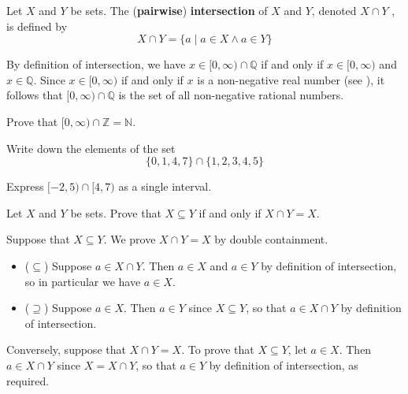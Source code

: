 \begin{definition}
Let $X$ and $Y$ be sets. The (\textbf{pairwise}) \textbf{intersection} of $X$ and $Y$, denoted $X \cap Y$ , is defined by
\[ X \cap Y = \{ a \mid a \in X \wedge a \in Y \} \]
\end{definition}

\begin{example}
By definition of intersection, we have $x \in [0,\infty) \cap \mathbb{Q}$ if and only if $x \in [0,\infty)$ and $x \in \mathbb{Q}$. Since $x \in [0,\infty)$ if and only if $x$ is a non-negative real number (see ), it follows that $[0,\infty) \cap \mathbb{Q}$ is the set of all non-negative rational numbers.
\end{example}

\begin{exercise}
Prove that $[0,\infty) \cap \mathbb{Z} = \mathbb{N}$.
\end{exercise}

\begin{exercise}
Write down the elements of the set
\[ \{ 0, 1, 4, 7 \} \cap \{ 1, 2, 3, 4, 5 \} \]
\end{exercise}

\begin{exercise}
Express $[-2,5) \cap [4,7)$ as a single interval.
\end{exercise}

\begin{proposition}
\label{propSubsetFromIntersection}
Let $X$ and $Y$ be sets. Prove that $X \subseteq Y$ if and only if $X \cap Y = X$.
\end{proposition}

\begin{cproof}
Suppose that $X \subseteq Y$. We prove $X \cap Y = X$ by double containment.
\begin{itemize}
\item ($\subseteq$) Suppose $a \in X \cap Y$. Then $a \in X$ and $a \in Y$ by definition of intersection, so in particular we have $a \in X$.
\item ($\supseteq$) Suppose $a \in X$. Then $a \in Y$ since $X \subseteq Y$, so that $a \in X \cap Y$ by definition of intersection.
\end{itemize}

Conversely, suppose that $X \cap Y = X$. To prove that $X \subseteq Y$, let $a \in X$. Then $a \in X \cap Y$ since $X = X \cap Y$, so that $a \in Y$ by definition of intersection, as required.
\end{cproof}

